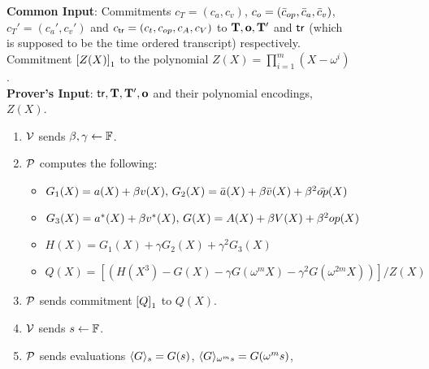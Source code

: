 \begin{figure}[htbp]

    \begin{mdframed}
    {
            {\bf Common Input}: Commitments $c_T=(c_a,c_v)$, $c_o=(\bar{c}_\op, \bar{c}_a, \bar{c}_v)$, $c_T'=(c_a', c_v')$
        and $c_\tr=(c_t, c_\op, c_A, c_V)$ to $\vecT,\vec{o},\vecT'$ and $\tr$ (which is supposed to be the time ordered transcript) respectively. Commitment $\gone{Z(X)}$ to the polynomial
        $Z(X)=\prod_{i=1}^m (X-\omega^i)$.\\
    {\bf Prover's Input}: $\tr, \vecT, \vecT', \vec{o}$ and their polynomial encodings, $Z(X)$.
        \begin{enumerate}[leftmargin=1em, label=\arabic*.]
            \item $\verifier$ sends $\beta,\gamma\gets \F$.
            \item $\prover$ computes the following:
            \begin{itemize}[label=-]
            	\item $G_1(X) = a(X) + \beta v(X),\, G_2(X) = \bar{a}(X) + \beta \bar{v}(X) + \beta^2 \bar{\op}(X)$
            	\item $G_3(X) = a^*(X) + \beta v^*(X),\, G(X) = A(X) + \beta V(X) + \beta^2 \op(X)$
            	\item $H(X) = G_1(X) + \gamma G_2(X) + \gamma^2 G_3(X)$
            	\item $Q(X) = [(H(X^3) - G(X) - \gamma G(\omega^m X) - \gamma^2 G(\omega^{2m} X))]/Z(X)$
            \end{itemize}
            \item $\prover$ sends commitment $\gone{Q}$ to $Q(X)$.
            \item $\verifier$ sends $s\gets\F$.
            \item $\prover$ sends evaluations $\val{s}{G}=G(s)$, $\val{\omega^m s}{G}=G(\omega^m s)$,

\end{enumerate}}
\end{mdframed}
\end{figure}
